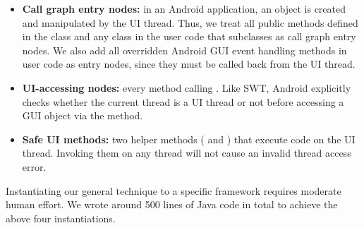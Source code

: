 \begin{itemize}

\item \textbf{Call graph entry nodes: }in an Android application,
an  object is created and manipulated by the UI thread. Thus, we treat
all public methods defined in the  class 
and any class in the user code that subclasses  as call graph entry nodes.
We also add all overridden Android GUI event handling methods in user
code as entry nodes, since they must be called back from the UI thread.

\item \textbf{UI-accessing nodes: }every method calling .
Like SWT, Android explicitly checks whether
the current thread is a UI thread or not before accessing a GUI object via
the  method.

\item \textbf{Safe UI methods: } two helper methods (
and ) that execute code on the UI thread. 
Invoking them on any thread will not cause an invalid thread access error.

\end{itemize}


Instantiating our general technique to  a specific framework
requires moderate human effort. We wrote around 500 lines of Java code in total to achieve
the above four instantiations.
